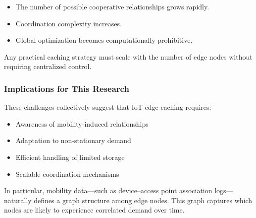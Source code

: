 \begin{itemize}
    \item The number of possible cooperative relationships grows rapidly.
    \item Coordination complexity increases.
    \item Global optimization becomes computationally prohibitive.
\end{itemize}

Any practical caching strategy must scale with the number of edge nodes without requiring centralized control.

\subsubsection{Implications for This Research}

These challenges collectively suggest that IoT edge caching requires:

\begin{itemize}
    \item Awareness of mobility-induced relationships
    \item Adaptation to non-stationary demand
    \item Efficient handling of limited storage
    \item Scalable coordination mechanisms
\end{itemize}

In particular, mobility data—such as device–access point association logs—naturally defines a graph structure among edge nodes. This graph captures which nodes are likely to experience correlated demand over time.
